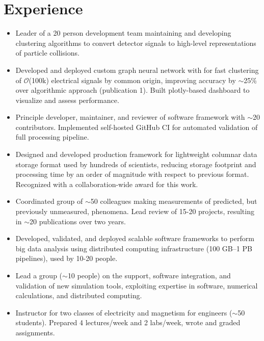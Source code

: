 \documentclass[9pt,a4paper]{moderncv}
\begin{document}
\section{Experience}
{
\begin{itemize}
    \item Leader of a 20 person development team maintaining and developing clustering algorithms to convert detector signals to high-level representations of particle collisions.
    \item Developed and deployed custom graph neural network with for fast clustering of $\mathcal{O}$(100k) electrical signals by common origin,
        improving accuracy by $\sim$25\% over algorithmic approach (publication 1). Built plotly-based dashboard to visualize and assess performance.
    \item Principle developer, maintainer, and reviewer of software framework with $\sim$20 contributors. Implemented self-hosted GitHub CI for automated validation of full processing pipeline.
    \item Designed and developed production framework for lightweight columnar data storage format used by hundreds of scientists, reducing storage footprint and processing time by an order of magnitude with respect to previous format. Recognized with a collaboration-wide award for this work.
    \item Coordinated group of $\sim$50 colleagues making measurements of predicted, but previously unmeasured, phenomena. Lead review of 15-20 projects, resulting in $\sim$20 publications over two years.
\end{itemize}
}

{
\begin{itemize}
    \item Developed, validated, and deployed scalable software frameworks to perform big data analysis using
distributed computing infrastructure (100 GB--1 PB pipelines), used by 10-20 people.
    \item Lead a group ($\sim$10 people) on the support, software integration, and validation of new simulation tools, exploiting expertise in software, numerical calculations, and distributed computing.
    \item Instructor for two classes of electricity and magnetism for engineers ($\sim$50 students). Prepared 4 lectures/week and 2 labs/week, wrote and graded assignments.
\end{itemize}
}
\end{document}
